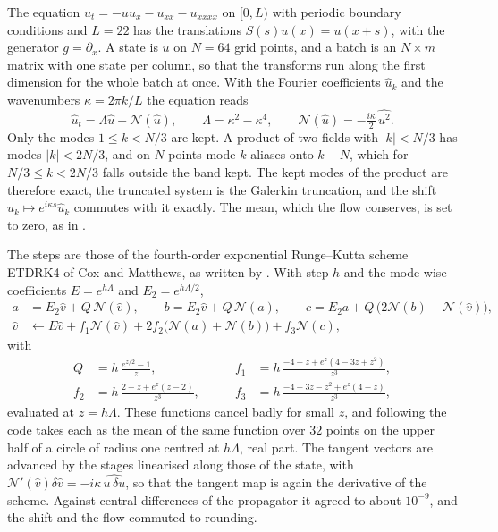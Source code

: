 \documentclass[11pt,a4paper]{article}
\begin{document}
The equation $u_t = -u u_x - u_{xx} - u_{xxxx}$ on $[0, L)$ with periodic boundary conditions and
$L = 22$ has the translations $S(s)u(x) = u(x + s)$, with the generator $g = \partial_x$. A state is
$u$ on $N = 64$ grid points, and a batch is an $N \times m$ matrix with one state per column, so that
the transforms run along the first dimension for the whole batch at once. With the Fourier
coefficients $\hat u_k$ and the wavenumbers $\kappa = 2\pi k / L$ the equation reads
\begin{equation}
  \hat u_t = \Lambda \hat u + \mathcal{N}(\hat u), \qquad \Lambda = \kappa^2 - \kappa^4, \qquad
  \mathcal{N}(\hat u) = -\tfrac{i\kappa}{2}\, \widehat{u^2} .
\end{equation}
Only the modes $1 \leq k < N/3$ are kept. A product of two fields with $|k| < N/3$ has modes $|k| <
2N/3$, and on $N$ points mode $k$ aliases onto $k - N$, which for $N/3 \leq k < 2N/3$ falls outside
the band kept. The kept modes of the product are therefore exact, the truncated system is the
Galerkin truncation, and the shift $\hat u_k \mapsto e^{i\kappa s}\hat u_k$ commutes with it
exactly. The mean, which the flow conserves, is set to zero, as in \citet[equation
(2.4)]{cvitanovic2010}.

The steps are those of the fourth-order exponential Runge--Kutta scheme ETDRK4 of Cox and Matthews,
as written by \citet{kassam2005}. With step $h$ and the mode-wise coefficients $E = e^{h\Lambda}$
and $E_2 = e^{h\Lambda/2}$,
\begin{equation}
  \begin{aligned}
    a &= E_2 \hat v + Q\, \mathcal{N}(\hat v), \qquad
    b = E_2 \hat v + Q\, \mathcal{N}(a), \qquad
    c = E_2 a + Q\, \big(2\mathcal{N}(b) - \mathcal{N}(\hat v)\big), \\
    \hat v &\leftarrow E \hat v + f_1 \mathcal{N}(\hat v) + 2 f_2 \big(\mathcal{N}(a) + \mathcal{N}(b)\big)
      + f_3 \mathcal{N}(c),
  \end{aligned}
\end{equation}
with
\begin{equation}
  \begin{aligned}
    Q &= h\,\frac{e^{z/2} - 1}{z}, &\qquad
    f_1 &= h\,\frac{-4 - z + e^z(4 - 3z + z^2)}{z^3}, \\
    f_2 &= h\,\frac{2 + z + e^z(z - 2)}{z^3}, &\qquad
    f_3 &= h\,\frac{-4 - 3z - z^2 + e^z(4 - z)}{z^3},
  \end{aligned}
\end{equation}
evaluated at $z = h\Lambda$. These functions cancel badly for small $z$, and following
\citet{kassam2005} the code takes each as the mean of the same function over $32$ points on the
upper half of a circle of radius one centred at $h\Lambda$, real part. The tangent vectors are
advanced by the stages linearised along those of the state, with $\mathcal{N}'(\hat v)\delta\hat v =
-i\kappa\, \widehat{u\,\delta u}$, so that the tangent map is again the derivative of the scheme.
Against central differences of the propagator it agreed to about $10^{-9}$, and the shift and the
flow commuted to rounding.
\end{document}
